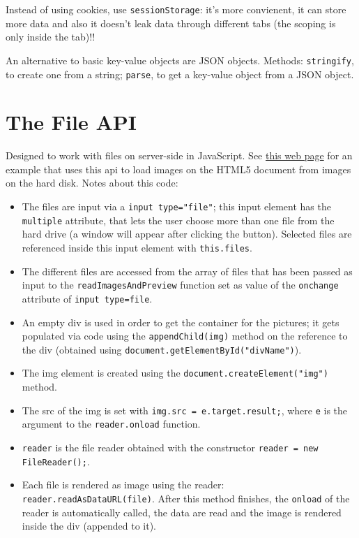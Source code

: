 \documentclass[a4paper,11pt]{book}
\begin{document}
Instead of using cookies, use \texttt{sessionStorage}: it's more convienent,
it can store more data and also it doesn't leak data through different tabs
(the scoping is only inside the tab)!!

An alternative to basic key-value objects are JSON objects.
Methods: \texttt{stringify}, to create one from a string; \texttt{parse},
to get a key-value object from a JSON object.

\section{The File API}
Designed to work with files on server-side in JavaScript. See
\href{http://pdata.altervista.org/HTML5/files/files.html}{this web page}
for an example
that uses this api to load images on the HTML5 document from images on the
hard disk. Notes about this code:
\begin{itemize}
\item The files are input via a \texttt{input type="file"};
this input element has the \texttt{multiple} attribute, that lets the user choose
more than one file from the hard drive (a window will appear after clicking the
button). Selected files are referenced inside this input element with
\texttt{this.files}.
\item The different files are accessed from the array of files that has been
passed as input to the \texttt{readImagesAndPreview} function set as value
of the \texttt{onchange} attribute of \texttt{input type=file}.
\item An empty div is used in order to get the container for the pictures; it gets
populated via code using the \texttt{appendChild(img)} method on the reference to
the div (obtained using \texttt{document.getElementById("divName")}).
\item The img element is created using the \texttt{document.createElement("img")}
method.
\item The src of the img is set with \texttt{img.src = e.target.result;}, where
\texttt{e} is the argument to the \texttt{reader.onload} function.
\item \texttt{reader} is the file reader obtained with the constructor
\texttt{reader = new FileReader();}.
\item Each file is rendered as image using the reader:
\texttt{reader.readAsDataURL(file)}. After this method finishes, the \texttt{onload}
of the reader is automatically called, the data are read and the image is rendered
inside the div (appended to it).
\end{itemize}
\end{document}
